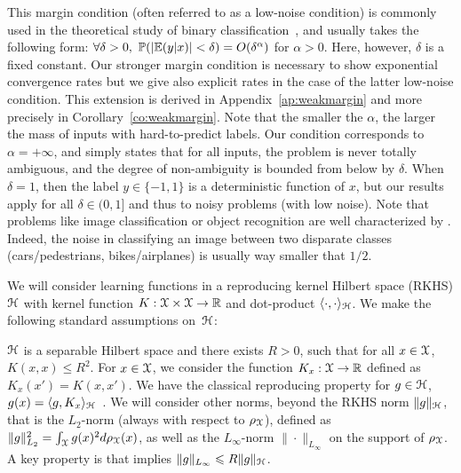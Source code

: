 \documentclass[final]{colt2018} %
\begin{document}
This margin condition (often referred to as a low-noise condition) is commonly used in the theoretical study of binary classification~\citep{mammen1999smooth,audibert2007fast,koltchinskii2005exponential}, and usually takes the following form:  
$\forall \delta>0,\ {\mathbb P}(  |{\mathbb E}(y|x) | < \delta ) = O( \delta^\alpha)$ for $\alpha >0$. Here, however, $\delta$ is a fixed constant. Our stronger margin condition  is necessary to show exponential convergence rates but we give also explicit rates in the case of the latter low-noise condition. This extension is derived in Appendix~\ref{ap:weakmargin} and more precisely in Corollary~\ref{co:weakmargin}. 
%
Note that the smaller the $\alpha$, the larger the mass of inputs with hard-to-predict labels. Our condition corresponds to $\alpha = +\infty$, and simply states that for all inputs, the problem is never totally ambiguous, and the degree of non-ambiguity is bounded from below by $\delta$. When $\delta = 1$, then the label $y \in \{-1,1\}$ is a deterministic function of $x$, but our results apply for all $\delta \in (0,1]$ and thus to noisy problems (with low noise). Note that problems like image classification or object recognition are well characterized by . Indeed, the noise in classifying an image between two disparate classes (cars/pedestrians, bikes/airplanes) is usually way smaller that $1/2$.

We will consider learning functions in a reproducing kernel Hilbert space (RKHS) ${\mathcal H}$ with kernel function $K: {\mathcal X} \times {\mathcal X} \to \mathbb{R}$ and dot-product $\langle \cdot , \cdot \rangle_{\mathcal H}$. We make the following standard assumptions on~${\mathcal H}$: 

\bas\label{asm:kernel-bounded}  
${\mathcal H}$ is a separable Hilbert space and there exists $R > 0$, such that  for all $x \in {\mathcal X}$, $K(x,x) \leqslant R^2$.
\eas
For $x \in {\mathcal X}$, we consider the function $K_x: {\mathcal X} \to \mathbb{R}$ defined as $K_x(x') = K(x,x')$. We have the classical reproducing property for $g \in {\mathcal H}$, $g(x) = \langle g, K_x \rangle_{\mathcal H}$~\citep{Cristianini2004,smola-book}.
We will consider other norms, beyond the RKHS norm $\| g \|_{\mathcal H}$, that is the $L_2$-norm (always with respect to ${\rho_{{\mathcal X}}}$), defined as 
$\| g\|_{L_2}^2 = \int_{{\mathcal X}} g(x)^2 d{\rho_{{\mathcal X}}}(x)$, as well as the $L_\infty$-norm  $\| \cdot \|_{L_\infty}$ on the support of ${\rho_{{\mathcal X}}}$. A key property is that  implies $\| g\|_{L_\infty} \leqslant R \| g\|_{\mathcal H}$. 

\end{document}
